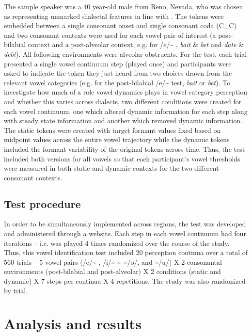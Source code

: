 \documentclass[output=paper]{LSP/langsci}
\begin{document}
The sample speaker was a 40 year-old male from Reno, Nevada, who was chosen as representing unmarked dialectal features in line with \citet{clopper_acoustic_2004}. The tokens were embedded between a single consonant onset and single consonant coda (C\_C) and two consonant contexts were used for each vowel pair of interest (a post-bilabial context and a post-alveolar context, e.g. for /e/\~{}
, \textit{bait} \& \textit{bet} and\textit{ date} \& \textit{debt}). All following environments were alveolar obstruents. For the test, each trial presented a single vowel continuum step (played once) and participants were asked to indicate the token they just heard from two choices drawn from the relevant vowel categories (e.g. for the post-bilabial /e/\~{}
test, \textit{bait} or \textit{bet}). To investigate how much of a role vowel dynamics plays in vowel category perception and whether this varies across dialects, two different conditions were created for each vowel continuum, one which altered dynamic information for each step along with steady state information and another which removed dynamic information. The static tokens were created with target formant values fixed based on midpoint values across the entire vowel trajectory while the dynamic tokens included the formant variability of the original tokens across time. Thus, the test included both versions for all vowels so that each participant’s vowel thresholds were measured in both static and dynamic contexts for the two different consonant contexts. 

\subsection{Test procedure}
In order to be simultaneously implemented across regions, the test was developed and administered through a website. Each step in each vowel continuum had four iterations – i.e. was played 4 times randomized over the course of the study. Thus, this vowel identification test included 20 perception continua over a total of 560 trials – 5 vowel pairs (/e/\~{}
, /i/\~{}
\~{}
\~{}/o/, and 
\~{}/u/) X 2 consonantal environments (post-bilabial and post-alveolar) X 2 conditions (static and dynamic) X 7 steps per continua X 4 repetitions. The study was also randomized by trial. 

\section{Analysis and results}
\end{document}
